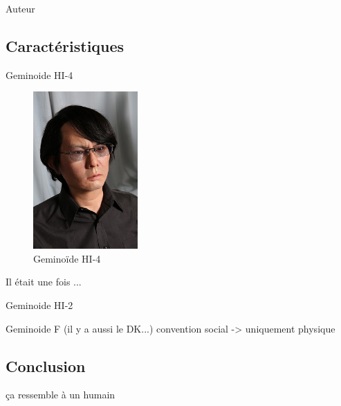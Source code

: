 \documentclass{beamer}
\begin{document}
\begin{frame}{Auteur}
\end{frame}

\subsection{Caractéristiques}
\begin{frame}{Geminoide HI-4}
  \begin{framed}
    \begin{figure}
      \centering
      \includegraphics[width=40mm]{data/HI-4}
      \caption{Geminoïde HI-4}
    \end{figure}
    Il était une fois ...
  \end{framed}
\end{frame}

\begin{frame}{Geminoide HI-2}
\end{frame}

\begin{frame}{Geminoide F}
  (il y a aussi le DK...)
  convention social -> uniquement physique
\end{frame}

\subsection{Conclusion}
\begin{frame}{ça ressemble à un humain}
\end{frame}
\end{document}
